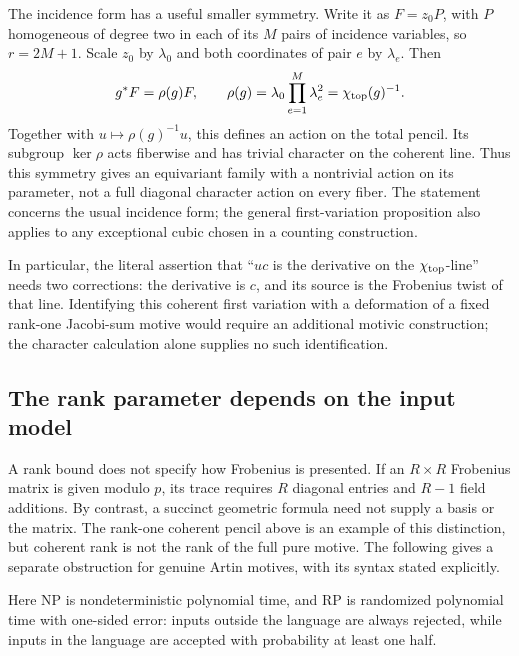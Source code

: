 The incidence form has a useful smaller symmetry.
Write it as $F=z_0P$, with $P$ homogeneous of degree two in
each of its $M$ pairs of incidence variables, so $r=2M+1$.
Scale $z_0$ by $\lambda_0$ and both coordinates of pair $e$
by $\lambda_e$.  Then
\[
 g^*F=\rho(g)F,\qquad
 \rho(g)=\lambda_0\prod_{e=1}^M\lambda_e^2
         =\chi_{\rm top}(g)^{-1}.
\]
Together with $u\mapsto\rho(g)^{-1}u$, this defines an action
on the total pencil.  Its subgroup $\ker\rho$ acts fiberwise
and has trivial character on the coherent line.  Thus this
symmetry gives an equivariant family with a nontrivial action
on its parameter, not a full diagonal character action on
every fiber.  The statement concerns the usual incidence form;
the general first-variation proposition also applies to any exceptional cubic chosen in a counting construction.

In particular, the literal assertion that ``$uc$ is the derivative
on the $\chi_{\rm top}$-line'' needs two corrections: the derivative
is $c$, and its source is the Frobenius twist of that line.
Identifying this coherent first variation with a deformation of
a fixed rank-one Jacobi-sum motive would require an additional
motivic construction; the character calculation alone supplies
no such identification.

\subsection{The rank parameter depends on the input model}
\label{subsec:rank-model}

A rank bound does not specify how Frobenius is presented.
If an $R\times R$ Frobenius matrix is given modulo $p$, its
trace requires $R$ diagonal entries and $R-1$ field additions.
By contrast, a succinct geometric formula need not supply a
basis or the matrix.  The rank-one coherent pencil above is
an example of this distinction, but coherent rank is not the
rank of the full pure motive.  The following gives a separate
obstruction for genuine Artin motives, with its syntax stated
explicitly.

Here $\mathrm{NP}$ is nondeterministic polynomial time, and
$\mathrm{RP}$ is randomized polynomial time with one-sided error:
inputs outside the language are always rejected, while inputs in the
language are accepted with probability at least one half.

